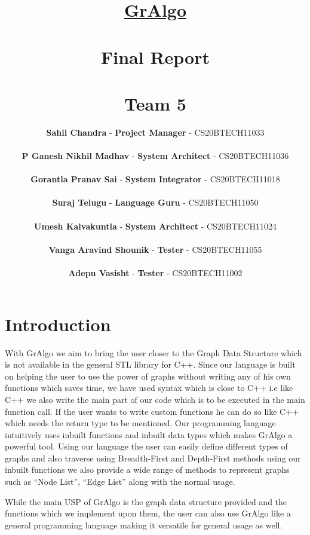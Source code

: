 \documentclass[english,a4paper,12pt]{report}
\title{\textbf{\underline{\Huge{GrAlgo}}}\\~\\
\textbf{Final Report}\\~\\
\textbf{Team 5}\\
}
\author{\textbf{Sahil Chandra} - \textbf{Project Manager} - CS20BTECH11033 
\\~\\  \textbf{P Ganesh Nikhil Madhav} - \textbf{System Architect} - CS20BTECH11036 
\\~\\ \textbf{Gorantla Pranav Sai} - \textbf{System Integrator} - CS20BTECH11018 \\~\\
\textbf{Suraj Telugu} - \textbf{Language Guru} - CS20BTECH11050  \\~\\
\textbf{Umesh Kalvakuntla} - \textbf{System Architect} - CS20BTECH11024   \\~\\
\textbf{Vanga Aravind Shounik} -  \textbf{Tester} - CS20BTECH11055 
\\~\\ \textbf{Adepu Vasisht} - \textbf{Tester} - CS20BTECH11002
}
\begin{document}
\titleformat{\chapter}[display]   
{\normalfont\huge\bfseries}{}{0pt}{\Huge}
\titlespacing*{\chapter}{0pt}{-30pt}{25pt}
\maketitle

\tableofcontents
  
\chapter{Introduction}
With GrAlgo we aim to bring the user closer to the Graph Data Structure which is not available in the general STL library for C++. Since our language is built on helping the user to use the power of graphs without writing any of his own functions which saves time, we have used syntax which is close to C++ i.e like C++ we also write the main part of our code which is to be executed in the main function call. If the user wants to write custom functions he can do so like C++ which needs the return type to be mentioned. Our programming language intuitively uses inbuilt functions and inbuilt data types which makes GrAlgo a powerful tool. Using our language the user can easily define different types of graphs and also traverse using  Breadth-First and Depth-First methods using our inbuilt functions we also provide a wide range of methods to represent graphs such as “Node List”, “Edge List” along with the normal usage.

While the main USP of GrAlgo is the graph data structure provided and the functions which we implement upon them, the user can also use GrAlgo like a general programming language making it versatile for general usage as well.
\end{document}
